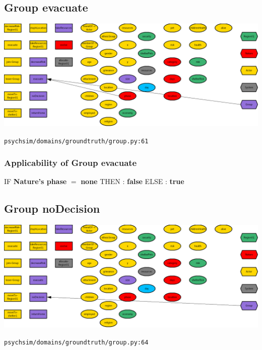 \documentclass{article}%
\begin{document}
%
\subsection{Group evacuate}%
\label{subsec:Group evacuate}%
\includegraphics[width=\textwidth]{images/Group-evacuate.png}%
\begin{flushleft}%
\verb|psychsim/domains/groundtruth/group.py:61|%
\end{flushleft}%
\subsubsection{Applicability of Group evacuate}%
\label{ssubsec:Applicability of Group evacuate}%
\begin{flushleft}%
IF %
\textbf{Nature's phase}%
$=$%
\textbf{none}%
\linebreak%
\hspace*{2em}%
THEN %
: %
\textbf{false}%
\linebreak%
\hspace*{2em}%
ELSE %
: %
\textbf{true}%
\end{flushleft}

%
\subsection{Group noDecision}%
\label{subsec:Group noDecision}%
\includegraphics[width=\textwidth]{images/Group-noDecision.png}%
\begin{flushleft}%
\verb|psychsim/domains/groundtruth/group.py:64|%
\end{flushleft}
\end{document}
